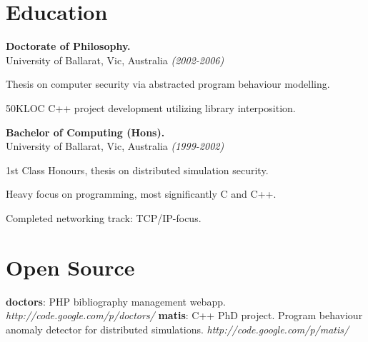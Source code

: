 \documentclass[margin]{res}
\begin{document}
\begin{resume}



\section{Education}

{\bf Doctorate of Philosophy.} \\
University of Ballarat, Vic, Australia {\em (2002-2006)} \\
\begin{description}
\item Thesis on computer security via abstracted program behaviour modelling.
\item 50KLOC C++ project development utilizing library interposition.
\end{description}

{\bf Bachelor of Computing (Hons).} \\
University of Ballarat, Vic, Australia {\em (1999-2002)} \\
\begin{description}
\item 1st Class Honours, thesis on distributed simulation security.
\item Heavy focus on programming, most significantly C and C++.
\item Completed networking track: TCP/IP-focus.
\end{description}


\section{Open Source}
{\bf doctors}: PHP bibliography management webapp.  {\em http://code.google.com/p/doctors/}
{\bf matis}: C++ PhD project.  Program behaviour anomaly detector for distributed simulations.  {\em http://code.google.com/p/matis/}




\end{resume}
\end{document}
